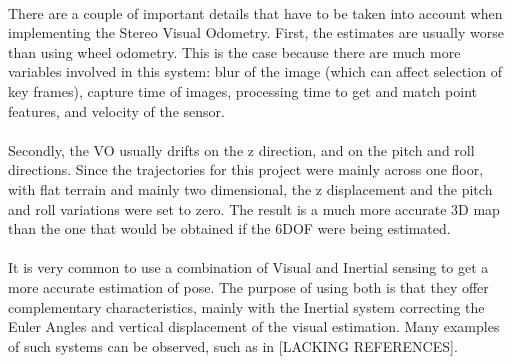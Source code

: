 \documentclass[12pt]{article}
\begin{document}
	\paragraph{}
	There are a couple of important details that have to be taken into account when implementing the Stereo Visual Odometry. First, the estimates are usually worse than using wheel odometry. This is the case because there are much more variables involved in this system: blur of the image (which can affect selection of key frames), capture time of images, processing time to get and match point features, and velocity of the sensor. 
	
	\paragraph{}
	Secondly, the VO usually drifts on the z direction, and on the pitch and roll directions. Since the trajectories for this project were mainly across one floor, with flat terrain and mainly two dimensional, the z displacement and the pitch and roll variations were set to zero. The result is a much more accurate 3D map than the one that would be obtained if the 6DOF were being estimated.
	
	\paragraph{}
	It is very common to use a combination of Visual and Inertial sensing to get a more accurate estimation of pose. The purpose of using both is that they offer complementary characteristics, mainly with the Inertial system correcting the Euler Angles and vertical displacement of the visual estimation. Many examples of such systems can be observed, such as in [LACKING REFERENCES].
	
\end{document}
